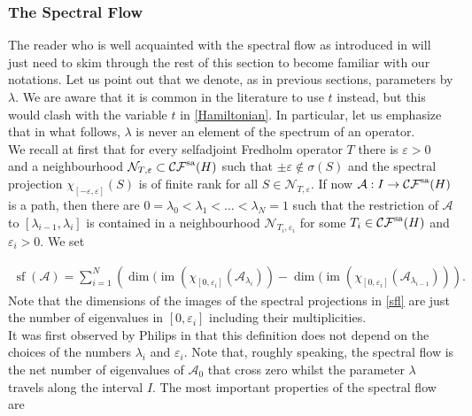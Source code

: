 \documentclass[a4paper,10pt]{article}
\DeclareMathOperator{\im}{im}
\DeclareMathOperator{\sfl}{sf}
\begin{document}
\subsubsection{The Spectral Flow}\label{section-sfl}
The reader who is well acquainted with the spectral flow as introduced in \cite{UnbSpecFlow} will just need to skim through the rest of this section to become familiar with our notations. Let us point out that we denote, as in previous sections, parameters by $\lambda$. We are aware that it is common in the literature to use $t$ instead, but this would clash with the variable $t$ in \eqref{Hamiltonian}. In particular, let us emphasize that in what follows, $\lambda$ is never an element of the spectrum of an operator.\\
We recall at first that for every selfadjoint Fredholm operator $T$ there is $\varepsilon>0$ and a neighbourhood $\mathcal{N}_{T,\varepsilon}\subset\mathcal{CF}^\textup{sa}(H)$ such that $\pm\varepsilon\notin\sigma(S)$ and the spectral projection $\chi_{[-\varepsilon,\varepsilon]}(S)$ is of finite rank for all $S\in\mathcal{N}_{T,\varepsilon}$. If now $\mathcal{A}:I\rightarrow\mathcal{CF}^\textup{sa}(H)$ is a path, then there are $0=\lambda_0<\lambda_1<\ldots<\lambda_N=1$ such that the restriction of $\mathcal{A}$ to $[\lambda_{i-1},\lambda_i]$ is contained in a neighbourhood $\mathcal{N}_{T_i,\varepsilon_i}$ for some $T_i\in\mathcal{CF}^\textup{sa}(H)$ and $\varepsilon_i>0$. We set

\begin{align}\label{sfl}
\sfl(\mathcal{A})=\sum^N_{i=1}{\left(\dim(\im(\chi_{[0,\varepsilon_i]}(\mathcal{A}_{\lambda_i}))-\dim(\im(\chi_{[0,\varepsilon_i]}(\mathcal{A}_{\lambda_{i-1}}))\right)}.
\end{align}
Note that the dimensions of the images of the spectral projections in \eqref{sfl} are just the number of eigenvalues in $[0,\varepsilon_i]$ including their multiplicities.\\ 
It was first observed by Philips in \cite{Philips} that this definition does not depend on the choices of the numbers $\lambda_i$ and $\varepsilon_i$. Note that, roughly speaking, the spectral flow is the net number of eigenvalues of $\mathcal{A}_0$ that cross zero whilst the parameter $\lambda$ travels along the interval $I$. The most important properties of the spectral flow are
\end{document}
